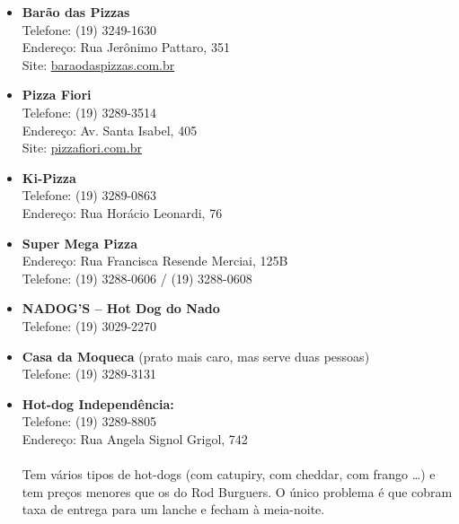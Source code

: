 \begin{itemize}
    \item   \textbf{Barão das Pizzas}
        \\Telefone: (19) 3249-1630
        \\Endereço: Rua Jerônimo Pattaro, 351
        \\Site: \url{baraodaspizzas.com.br}

    \item   \textbf{Pizza Fiori}
        \\Telefone: (19) 3289-3514
        \\Endereço: Av. Santa Isabel, 405
        \\Site: \url{pizzafiori.com.br}

    \item   \textbf{Ki-Pizza}
        \\Telefone: (19) 3289-0863
        \\Endereço: Rua Horácio Leonardi, 76

    \item   \textbf{Super Mega Pizza}
        \\Endereço: Rua Francisca Resende Merciai, 125B
        \\Telefone: (19) 3288-0606 / (19) 3288-0608

    \item   \textbf{NADOG'S -- Hot Dog do Nado}
        \\Telefone: (19) 3029-2270

    \item   \textbf{Casa da Moqueca} (prato mais caro, mas serve duas pessoas)
        \\Telefone: (19) 3289-3131



    \item   \textbf{Hot-dog Independência:}
        \\Telefone: (19) 3289-8805
        \\Endereço: Rua Angela Signol Grigol, 742
        \\\\
        Tem vários tipos de hot-dogs (com catupiry, com cheddar, com frango
        {\dots}) e tem preços menores que os do Rod Burguers. O único problema
        é que cobram taxa de entrega para um lanche e fecham à meia-noite.


\end{itemize}
